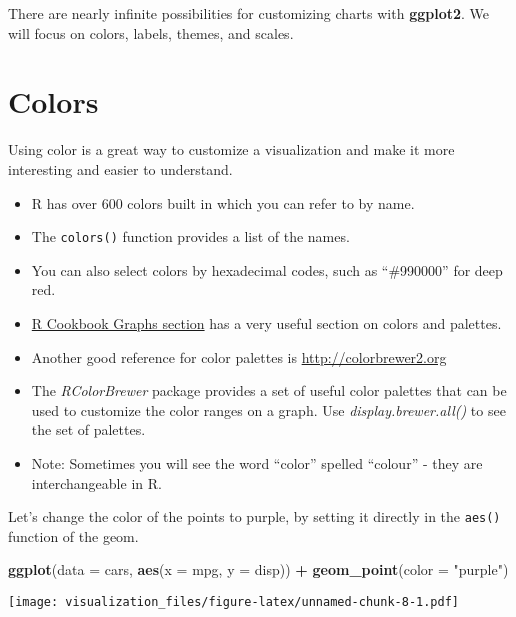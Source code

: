 \documentclass[oneside]{memoir}
\newenvironment{Shaded}{\begin{snugshade}}{\end{snugshade}}
\newcommand{\KeywordTok}[1]{\textcolor[rgb]{0.13,0.29,0.53}{\textbf{#1}}}
\newcommand{\DataTypeTok}[1]{\textcolor[rgb]{0.13,0.29,0.53}{#1}}
\newcommand{\StringTok}[1]{\textcolor[rgb]{0.31,0.60,0.02}{#1}}
\newcommand{\OperatorTok}[1]{\textcolor[rgb]{0.81,0.36,0.00}{\textbf{#1}}}
\newcommand{\NormalTok}[1]{#1}
\theoremstyle{definition}
\theoremstyle{definition}
\theoremstyle{definition}
\theoremstyle{remark}
\begin{document}
There are nearly infinite possibilities for customizing charts with
\textbf{ggplot2}. We will focus on colors, labels, themes, and scales.

\section{Colors}\label{colors}

Using color is a great way to customize a visualization and make it more
interesting and easier to understand.

\begin{itemize}
\item
  R has over 600 colors built in which you can refer to by name.
\item
  The \texttt{colors()} function provides a list of the names.
\item
  You can also select colors by hexadecimal codes, such as ``\#990000''
  for deep red.
\item
  \href{http://www.cookbook-r.com/Graphs/Colors_(ggplot2)/}{R Cookbook
  Graphs section} has a very useful section on colors and palettes.
\item
  Another good reference for color palettes is
  \url{http://colorbrewer2.org}
\item
  The \emph{RColorBrewer} package provides a set of useful color
  palettes that can be used to customize the color ranges on a graph.
  Use \emph{display.brewer.all()} to see the set of palettes.
\item
  Note: Sometimes you will see the word ``color'' spelled ``colour'' -
  they are interchangeable in R.
\end{itemize}

Let's change the color of the points to purple, by setting it directly
in the \texttt{aes()} function of the geom.

\begin{Shaded}
\begin{Highlighting}[]
\KeywordTok{ggplot}\NormalTok{(}\DataTypeTok{data =}\NormalTok{ cars, }\KeywordTok{aes}\NormalTok{(}\DataTypeTok{x =}\NormalTok{ mpg, }\DataTypeTok{y =}\NormalTok{ disp)) }\OperatorTok{+}
\StringTok{  }\KeywordTok{geom_point}\NormalTok{(}\DataTypeTok{color =} \StringTok{"purple"}\NormalTok{)}
\end{Highlighting}
\end{Shaded}

\texttt{[image: visualization\_files/figure-latex/unnamed-chunk-8-1.pdf]}
\end{document}
